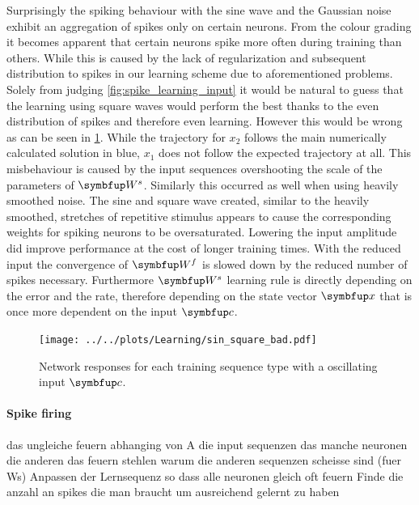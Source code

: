 Surprisingly the spiking behaviour with the sine wave and the Gaussian noise exhibit an aggregation of spikes only on certain neurons. From the colour grading it becomes apparent that certain neurons spike more often during training than others. While this is caused by the lack of regularization and subsequent distribution to spikes in our learning scheme due to aforementioned problems. Solely from judging \cref{fig:spike_learning_input} it would be natural to guess that the learning using square waves would perform the best thanks to the even distribution of spikes and therefore even learning. However this would be wrong as can be seen in \cref{fig:sin_square_bad}. While the trajectory for $x_2$ follows the main numerically calculated solution in blue, $x_1$ does not follow the expected trajectory at all. This misbehaviour is caused by the input sequences overshooting the scale of the parameters of $\bmu{W}^s$. Similarly this occurred as well when using heavily smoothed noise. The sine and square wave created, similar to the heavily smoothed, stretches of repetitive stimulus appears to cause the corresponding weights for spiking neurons to be oversaturated. Lowering the input amplitude did improve performance at the cost of longer training times. With the reduced input the convergence of $\bmu{W}^f$ is slowed down by the reduced number of spikes necessary. Furthermore $\bmu{W}^s$ learning rule is directly depending on the error and the rate, therefore depending on the state vector $\bmu{x}$ that is once more dependent on the input $\bmu{c}$.
\begin{figure}
	\centering
	\texttt{[image: ../../plots/Learning/sin\_square\_bad.pdf]}
	\caption{Network responses for each training sequence type with a oscillating input $\bmu{c}$.}
	\label{fig:sin_square_bad}
\end{figure}

\paragraph{Spike firing}

das ungleiche feuern abhanging von A
die input sequenzen
das manche neuronen die anderen das feuern stehlen
warum die anderen sequenzen scheisse sind (fuer Ws)
Anpassen der Lernsequenz so dass alle neuronen gleich oft feuern
Finde die anzahl an spikes die man braucht um ausreichend gelernt zu haben

